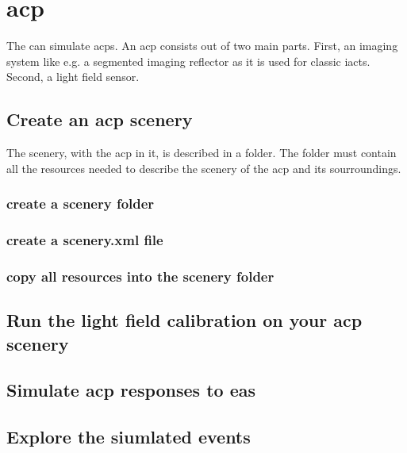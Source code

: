 \chapter{\acf{acp}}
%
The \tool{} can simulate \acp{acp}.
%
An \ac{acp} consists out of two main parts.
%
First, an imaging system like e.g. a segmented imaging reflector as it is used for classic \acp{iact}.
%
Second, a light field sensor.
%
\section{Create an \ac{acp} scenery}
The scenery, with the \ac{acp} in it, is described in a folder.
%
The folder must contain all the resources needed to describe the scenery of the \ac{acp} and its sourroundings.
%
\subsection{create a scenery folder}
%
\subsection{create a scenery.xml file}
%
\subsection{copy all resources into the scenery folder}
\section{Run the light field calibration on your \ac{acp} scenery}
\section{Simulate \ac{acp} responses to \ac{eas}}
\section{Explore the siumlated events}